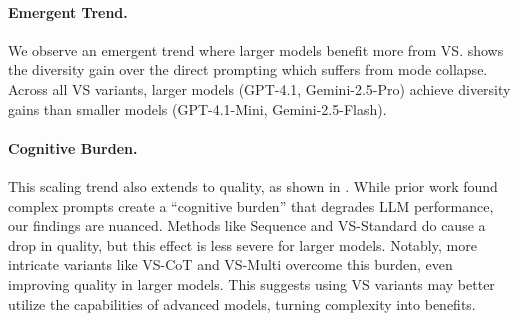 



\paragraph{Emergent Trend.}\label{sec:emergent_behavior}
We observe an emergent trend where larger models benefit more from VS.  shows the diversity gain over the direct prompting which suffers from mode collapse. 
Across all VS variants, larger models (GPT-4.1, Gemini-2.5-Pro) achieve diversity gains  than smaller models (GPT-4.1-Mini, Gemini-2.5-Flash). %



\paragraph{Cognitive Burden.} This scaling trend also extends to quality, as shown in . While prior work \citep{hu_fine-tuning_2024} found complex prompts create a ``cognitive burden'' that degrades LLM performance, our findings are nuanced. Methods like Sequence and VS-Standard do cause a drop in quality, but this effect is less severe for larger models. Notably, more intricate variants like VS-CoT and VS-Multi overcome this burden, even improving quality in larger models. This suggests using VS variants may better utilize the capabilities of advanced models, turning complexity into benefits.

